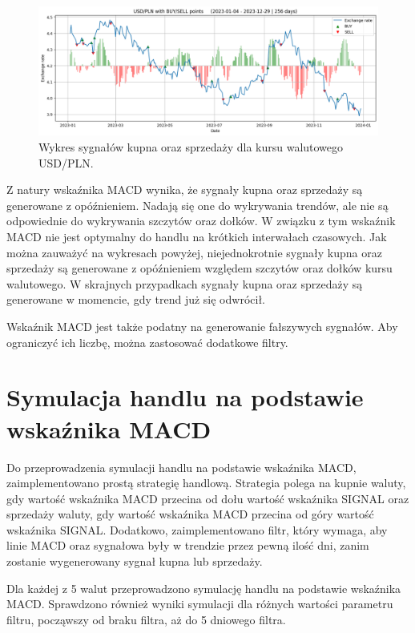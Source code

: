 \documentclass[12pt, a4paper]{article}
\begin{document}
\begin{figure}[ht]
    \centering
    \includegraphics[width=1.0\textwidth]{usd_pln_value_buy_sell.png}
    \caption{Wykres sygnałów kupna oraz sprzedaży dla kursu walutowego USD/PLN.}
    \label{fig:usd_pln_value_buy_sell}
\end{figure}

Z natury wskaźnika MACD wynika, że sygnały kupna oraz sprzedaży są generowane z opóźnieniem.
Nadają się one do wykrywania trendów, ale nie są odpowiednie do wykrywania szczytów oraz dołków.
W związku z tym wskaźnik MACD nie jest optymalny do handlu na krótkich interwałach czasowych.
Jak można zauważyć na wykresach powyżej, niejednokrotnie sygnały kupna oraz sprzedaży
są generowane z opóźnieniem względem szczytów oraz dołków kursu walutowego. W skrajnych przypadkach
sygnały kupna oraz sprzedaży są generowane w momencie, gdy trend już się odwrócił.

Wskaźnik MACD jest także podatny na generowanie fałszywych sygnałów. Aby ograniczyć
ich liczbę, można zastosować dodatkowe filtry.





\pagebreak
\section{Symulacja handlu na podstawie wskaźnika MACD}

Do przeprowadzenia symulacji handlu na podstawie wskaźnika MACD, zaimplementowano
prostą strategię handlową. Strategia polega na kupnie waluty, gdy wartość wskaźnika MACD
przecina od dołu wartość wskaźnika SIGNAL oraz sprzedaży waluty, gdy wartość wskaźnika MACD
przecina od góry wartość wskaźnika SIGNAL.
Dodatkowo, zaimplementowano filtr, który wymaga, aby linie MACD oraz sygnałowa były w trendzie
przez pewną ilość dni, zanim zostanie wygenerowany sygnał kupna lub sprzedaży.

Dla każdej z 5 walut przeprowadzono symulację handlu na podstawie wskaźnika MACD. Sprawdzono również
wyniki symulacji dla różnych wartości parametru filtru, począwszy od braku filtra, aż do 5 dniowego filtra.
\end{document}
